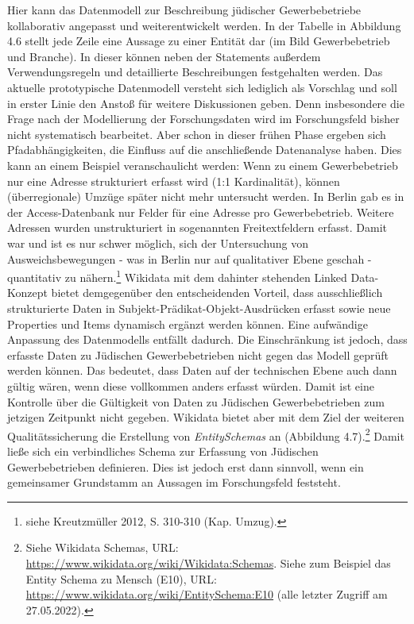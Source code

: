 Hier kann das Datenmodell zur Beschreibung jüdischer Gewerbebetriebe kollaborativ angepasst und weiterentwickelt werden. In der Tabelle in Abbildung 4.6 stellt jede Zeile eine Aussage zu einer Entität dar (im Bild Gewerbebetrieb und Branche). In dieser können neben der Statements außerdem Verwendungsregeln und detaillierte Beschreibungen festgehalten werden. Das aktuelle prototypische Datenmodell versteht sich lediglich als Vorschlag und soll in erster Linie den Anstoß für weitere Diskussionen geben. Denn insbesondere die Frage nach der Modellierung der Forschungsdaten wird im Forschungsfeld bisher nicht systematisch bearbeitet. Aber schon in dieser frühen Phase ergeben sich Pfadabhängigkeiten, die Einfluss auf die anschließende Datenanalyse haben. Dies kann an einem Beispiel veranschaulicht werden: Wenn zu einem Gewerbebetrieb nur eine Adresse strukturiert erfasst wird (1:1 Kardinalität), können (überregionale) Umzüge später nicht mehr untersucht werden. In Berlin gab es in der Access-Datenbank nur Felder für eine Adresse pro Gewerbebetrieb. Weitere Adressen wurden unstrukturiert in sogenannten Freitextfeldern erfasst. Damit war und ist es nur schwer möglich, sich der Untersuchung von Ausweichsbewegungen - was in Berlin nur auf qualitativer Ebene geschah - quantitativ zu nähern.\footnote{siehe Kreutzmüller 2012, S. 310-310 (Kap. Umzug).} Wikidata mit dem dahinter stehenden Linked Data-Konzept bietet demgegenüber den entscheidenden Vorteil, dass ausschließlich strukturierte Daten in Subjekt-Prädikat-Objekt-Ausdrücken erfasst sowie neue Properties und Items dynamisch ergänzt werden können. Eine aufwändige Anpassung des Datenmodells entfällt dadurch. Die Einschränkung ist jedoch, dass erfasste Daten zu Jüdischen Gewerbebetrieben nicht gegen das Modell geprüft werden können. Das bedeutet, dass Daten auf der technischen Ebene auch dann gültig wären, wenn diese vollkommen anders erfasst würden. Damit ist eine Kontrolle über die Gültigkeit von Daten zu Jüdischen Gewerbebetrieben zum jetzigen Zeitpunkt nicht gegeben. Wikidata bietet aber mit dem Ziel der weiteren Qualitätssicherung die Erstellung von \textit{EntitySchemas} an (Abbildung 4.7).\footnote{Siehe Wikidata Schemas, URL: \url{https://www.wikidata.org/wiki/Wikidata:Schemas}. Siehe zum Beispiel das Entity Schema zu Mensch (E10), URL: \url{https://www.wikidata.org/wiki/EntitySchema:E10} (alle letzter Zugriff am 27.05.2022).} Damit ließe sich ein verbindliches Schema zur Erfassung von Jüdischen Gewerbebetrieben definieren. Dies ist jedoch erst dann sinnvoll, wenn ein gemeinsamer Grundstamm an Aussagen im Forschungsfeld feststeht.

